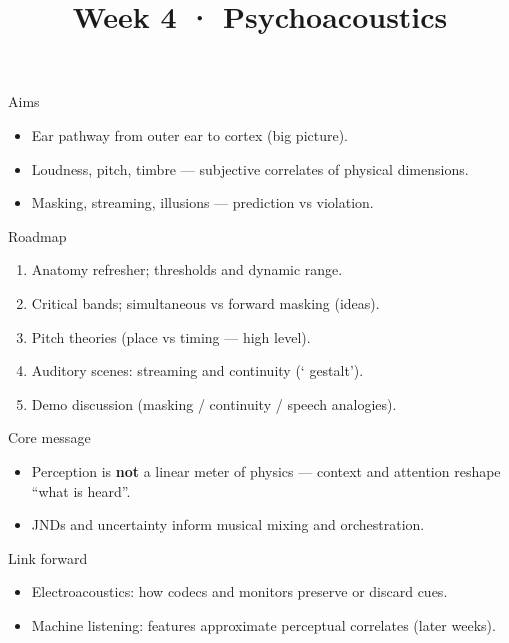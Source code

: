 \documentclass[aspectratio=169]{beamer}
\title{Week 4 · Psychoacoustics}
\subtitle{\coursename}
\institute{\instituteuo}
\date{}
\begin{document}
\begin{frame}
  \titlepage
\end{frame}

\begin{frame}{Aims}
  \begin{itemize}
    \item Ear pathway from outer ear to cortex (big picture).
    \item Loudness, pitch, timbre — subjective correlates of physical dimensions.
    \item Masking, streaming, illusions — prediction vs violation.
  \end{itemize}
\end{frame}

\begin{frame}{Roadmap}
  \begin{enumerate}
    \item Anatomy refresher; thresholds and dynamic range.
    \item Critical bands; simultaneous vs forward masking (ideas).
    \item Pitch theories (place vs timing — high level).
    \item Auditory scenes: streaming and continuity (` gestalt').
    \item Demo discussion (masking / continuity / speech analogies).
  \end{enumerate}
\end{frame}

\begin{frame}{Core message}
  \begin{itemize}
    \item Perception is \textbf{not} a linear meter of physics — context and attention reshape ``what is heard''.
    \item JNDs and uncertainty inform musical mixing and orchestration.
  \end{itemize}
\end{frame}

\begin{frame}{Link forward}
  \begin{itemize}
    \item Electroacoustics: how codecs and monitors preserve or discard cues.
    \item Machine listening: features approximate perceptual correlates (later weeks).
  \end{itemize}
\end{frame}
\end{document}

